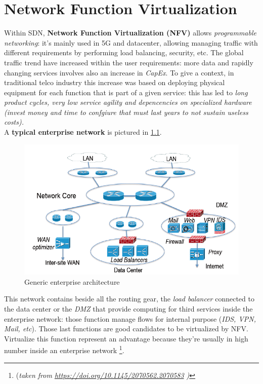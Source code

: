 \documentclass[10pt,a4paper]{report}
\theoremstyle{definition}
\begin{document}
\chapter{Network Function Virtualization} \label{sec:network-function-virtualization}
Within SDN, \textbf{Network Function Virtualization (NFV)} allows \textit{programmable networking}: it's mainly used in 5G and datacenter, allowing managing traffic with different requirements by performing load balancing, security, etc.
The global traffic trend have increased within the user requirements: more data and rapidly changing services involves also an increase in \textit{CapEx}.
To give a context, in traditional telco industry this increase was based on deploying physical equipment for each function that is part of a given service: this has led to \textit{long product cycles, very low service agility and depencencies on specialized hardware (invest money and time to confgiure that must last years to not sustain useless costs).}\\
A \textbf{typical enterprise network} is pictured in \ref{ent-netw}.

\begin{figure}[h!]
	\centering\includegraphics[scale=0.50]{images/Pasted image 20230405162647.png}
	\caption{Generic enterprise architecture}
\label{ent-netw}
\end{figure}

This network contains beside all the routing gear, the \textit{load balancer} connected to the data center or the \textit{DMZ} that provide computing for third services inside the enterprise network: those function manage flows for internal purpose (\textit{IDS, VPN, Mail, etc}). Those last functions are good candidates to be virtualized by NFV.\\
Virtualize this function represent an advantage because they're usually in high number inside an enterprise network \footnote{(\textit{taken from \href{https://doi.org/10.1145/2070562.2070583}{https://doi.org/10.1145/2070562.2070583} )}}.
\end{document}
